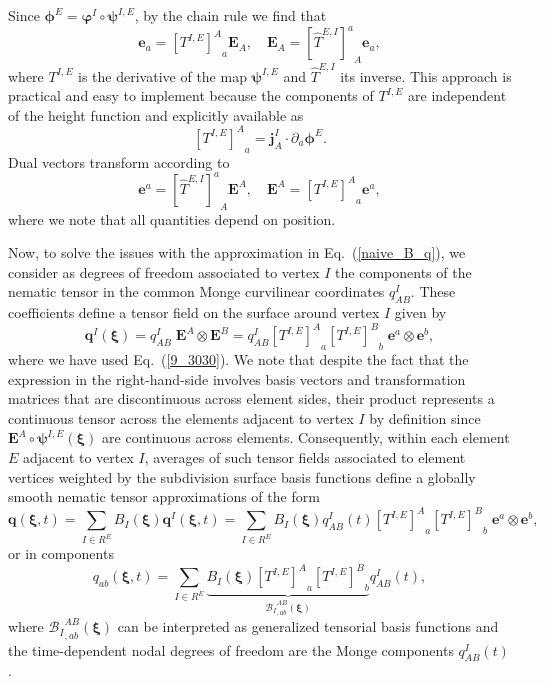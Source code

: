 Since $\bm{\phi}^E = \bm{\varphi}^I \circ \bm{\psi}^{I,E}$, by the chain rule we find that 
\begin{equation} \label{9_30}
    \bm{e}_a = {\left[T^{I,E}\right]^A}_a \bm{E}_A ,\quad  
     \bm{E}_A = {\left[\widehat{T}^{E,I}\right]^a}_A \bm{e}_a,
\end{equation}
where $T^{I,E}$ is the derivative of the map $\bm{\psi}^{I,E}$ and $\widehat{T}^{E,I}$ its inverse. This approach is practical and easy to implement because the components of $T^{I,E}$ are independent of the height function and explicitly available as \cite{torres2020}
\begin{equation} 
{\left[T^{I,E}\right]^A}_a = \bm{j}_A^I \cdot \partial_a \bm{\phi}^E.
\end{equation}
Dual vectors transform according to 
\begin{equation} \label{9_3030}
    \bm{e}^a = {\left[\widehat{T}^{E,I}\right]^a}_A \bm{E}^A ,\quad  
     \bm{E}^A = {\left[T^{I,E}\right]^A}_a \bm{e}^a,
\end{equation}
where we note that all quantities depend on position.

Now, to solve the issues with the approximation in Eq.~(\ref{naive_B_q}), we consider as degrees of freedom associated to vertex $I$ the components of the nematic tensor in the common Monge curvilinear coordinates $q_{AB}^I$. These coefficients define a tensor field on the surface around vertex $I$ given by 
\begin{equation} \label{9_30}
\bm{q}^I(\bm{\xi}) = q_{AB}^I \; \bm{E}^A \otimes \bm{E}^B = q_{AB}^I {\left[T^{I,E}\right]^A}_a {\left[T^{I,E}\right]^B}_b \; \bm{e}^a \otimes \bm{e}^b,
\end{equation}
where we have used Eq.~(\ref{9_3030}). We note that despite the fact that the expression in the right-hand-side involves basis vectors and transformation matrices that are discontinuous across element sides, their product represents a continuous tensor across the elements adjacent to vertex $I$ by definition since $\bm{E}^A\circ\bm{\psi}^{I,E}(\bm{\xi})$ are continuous across elements. Consequently, within each element $E$ adjacent to vertex $I$, averages of such tensor fields associated to element vertices weighted by the subdivision surface basis functions define a globally smooth nematic tensor approximations of the form
\begin{equation} \label{good_B_q}
  \bm{q}(\bm{\xi},t)= \underset{I \in R^E}{\mathrm{\sum}} B_I(\bm{\xi})  \bm{q}^I(\bm{\xi},t)= \underset{I \in R^E}{\mathrm{\sum}} B_I(\bm{\xi}) q_{AB}^I(t) {\left[T^{I,E}\right]^A}_a {\left[T^{I,E}\right]^B}_b \; \bm{e}^a \otimes \bm{e}^b ,
\end{equation} 
or in components 
\begin{equation} \label{good_B_q2}
  q_{ab}(\bm{\xi},t)= \underset{I \in R^E}{\mathrm{\sum}} \underbrace{B_I(\bm{\xi}) {\left[T^{I,E}\right]^A}_a {\left[T^{I,E}\right]^B}_b }_{{\mathcal{B}_I}_{,ab}^{AB}(\bm{\xi})} q_{AB}^I(t),
\end{equation} 
where ${\mathcal{B}_I}_{,ab}^{AB}(\bm{\xi})$ can be interpreted as generalized tensorial basis functions and the time-dependent nodal degrees of freedom are the Monge components $q_{AB}^I(t)$.

